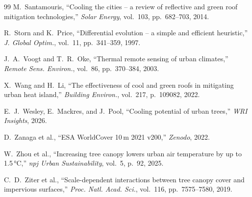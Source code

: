 \documentclass[conference]{IEEEtran}
\begin{document}
\begin{thebibliography}{99}
M.~Santamouris, ``Cooling the cities -- a review of reflective and green
roof mitigation technologies,'' \textit{Solar Energy}, vol.~103,
pp.~682--703, 2014.

R.~Storn and K.~Price, ``Differential evolution -- a simple and efficient
heuristic,'' \textit{J. Global Optim.}, vol.~11, pp.~341--359, 1997.

J.~A.~Voogt and T.~R.~Oke, ``Thermal remote sensing of urban climates,''
\textit{Remote Sens. Environ.}, vol.~86, pp.~370--384, 2003.

X.~Wang and H.~Li, ``The effectiveness of cool and green roofs in mitigating
urban heat island,'' \textit{Building Environ.}, vol.~217, p.~109082, 2022.

E.~J.~Wesley, E.~Mackres, and J.~Pool, ``Cooling potential of urban trees,''
\textit{WRI Insights}, 2026.

D.~Zanaga et al., ``ESA WorldCover 10\,m 2021 v200,'' \textit{Zenodo}, 2022.

W.~Zhou et al., ``Increasing tree canopy lowers urban air temperature by up
to 1.5\,°C,'' \textit{npj Urban Sustainability}, vol.~5, p.~92, 2025.

C.~D.~Ziter et al., ``Scale-dependent interactions between tree canopy cover
and impervious surfaces,'' \textit{Proc. Natl. Acad. Sci.}, vol.~116,
pp.~7575--7580, 2019.

\end{thebibliography}
\end{document}

